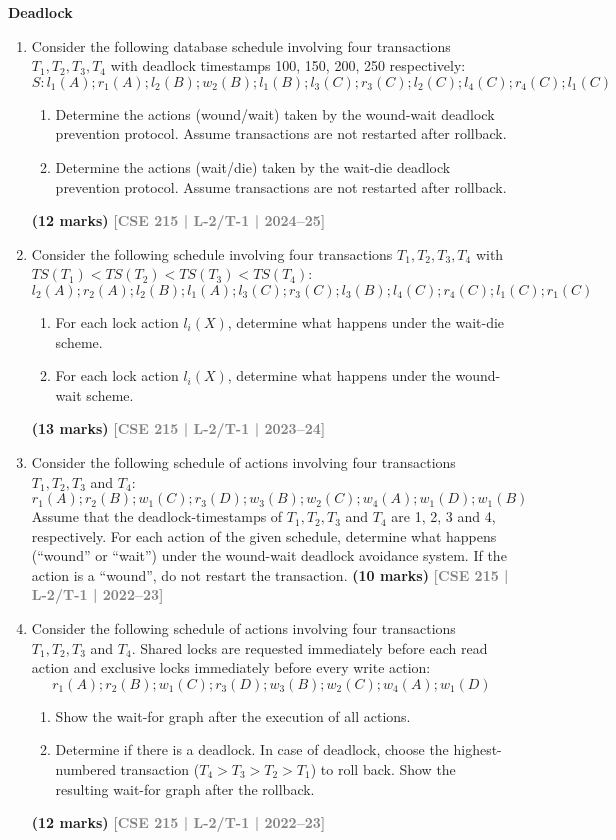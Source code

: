 \documentclass[12pt]{article}
\newcommand{\yr}[1]{\hfill\textcolor{gray}{\small\textbf{[#1]}}}
\newcommand{\mk}[1]{\textcolor{orange!70!black}{\small\textbf{(#1 marks)}}}
\newcounter{subtopicbm}
\newcommand{\subtopic}[2]{%
  \stepcounter{subtopicbm}%
  \pdfbookmark[2]{#2}{subtopicbm.\thesubtopicbm}%
  \vspace{10pt}
  \noindent\begin{tcolorbox}[colback=#1!8,colframe=#1,boxrule=0.6pt,arc=4pt,
    left=6pt,right=6pt,top=4pt,bottom=4pt]
    \small\bfseries\textcolor{#1}{#2}
  \end{tcolorbox}
  \vspace{2pt}
}
\begin{document}
\subtopic{cE}{Deadlock}\label{sub:s7-deadlock}

\begin{enumerate}

\item Consider the following database schedule involving four transactions $T_1, T_2, T_3, T_4$ with deadlock timestamps 100, 150, 200, 250 respectively:
\[S\colon l_1(A); r_1(A); l_2(B); w_2(B); l_1(B); l_3(C); r_3(C); l_2(C); l_4(C); r_4(C); l_1(C)\]
\begin{enumerate}
  \item Determine the actions (wound/wait) taken by the wound-wait deadlock prevention protocol. Assume transactions are not restarted after rollback.
  \item Determine the actions (wait/die) taken by the wait-die deadlock prevention protocol. Assume transactions are not restarted after rollback.
\end{enumerate}
\mk{12} \yr{CSE 215 | L-2/T-1 | 2024--25}


\item Consider the following schedule involving four transactions $T_1, T_2, T_3, T_4$ with $TS(T_1) < TS(T_2) < TS(T_3) < TS(T_4)$:
\[l_2(A); r_2(A); l_2(B); l_1(A); l_3(C); r_3(C); l_3(B); l_4(C); r_4(C); l_1(C); r_1(C)\]
\begin{enumerate}
  \item For each lock action $l_i(X)$, determine what happens under the wait-die scheme.
  \item For each lock action $l_i(X)$, determine what happens under the wound-wait scheme.
\end{enumerate}
  \mk{13} \yr{CSE 215 | L-2/T-1 | 2023--24}


\item Consider the following schedule of actions involving four transactions $T_1, T_2, T_3$ and $T_4$:
\[r_1(A); r_2(B); w_1(C); r_3(D); w_3(B); w_2(C); w_4(A); w_1(D); w_1(B)\]
Assume that the deadlock-timestamps of $T_1, T_2, T_3$ and $T_4$ are 1, 2, 3 and 4, respectively. For each action of the given schedule, determine what happens (``wound'' or ``wait'') under the wound-wait deadlock avoidance system. If the action is a ``wound'', do not restart the transaction.
\mk{10} \yr{CSE 215 | L-2/T-1 | 2022--23}


\item Consider the following schedule of actions involving four transactions $T_1, T_2, T_3$ and $T_4$. Shared locks are requested immediately before each read action and exclusive locks immediately before every write action:
\[r_1(A); r_2(B); w_1(C); r_3(D); w_3(B); w_2(C); w_4(A); w_1(D)\]
\begin{enumerate}
  \item Show the wait-for graph after the execution of all actions.
  \item Determine if there is a deadlock. In case of deadlock, choose the highest-numbered transaction ($T_4 > T_3 > T_2 > T_1$) to roll back. Show the resulting wait-for graph after the rollback.
\end{enumerate}
\mk{12} \yr{CSE 215 | L-2/T-1 | 2022--23}



\end{enumerate}
\end{document}
